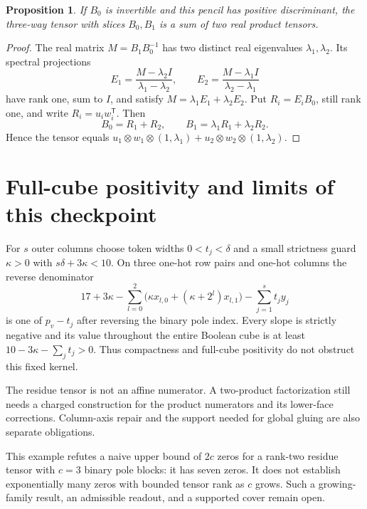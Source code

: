 \documentclass[11pt]{article}
\newtheorem{proposition}{Proposition}
\begin{document}
\begin{proposition}
If $B_0$ is invertible and this pencil has positive discriminant, the
three-way tensor with slices $B_0,B_1$ is a sum of two real product tensors.
\end{proposition}
\begin{proof}
The real matrix $M=B_1B_0^{-1}$ has two distinct real eigenvalues
$\lambda_1,\lambda_2$. Its spectral projections
\[
 E_1=\frac{M-\lambda_2I}{\lambda_1-\lambda_2},\qquad
 E_2=\frac{M-\lambda_1I}{\lambda_2-\lambda_1}
\]
have rank one, sum to $I$, and satisfy
$M=\lambda_1E_1+\lambda_2E_2$. Put $R_i=E_iB_0$, still rank one,
and write $R_i=u_iw_i^{\mathsf T}$. Then
\[
 B_0=R_1+R_2,\qquad B_1=\lambda_1R_1+\lambda_2R_2.
\]
Hence the tensor equals
$u_1\otimes w_1\otimes(1,\lambda_1)+
 u_2\otimes w_2\otimes(1,\lambda_2)$.
\end{proof}

\section{Full-cube positivity and limits of this checkpoint}
For $s$ outer columns choose token widths $0<t_j<\delta$ and a small
strictness guard $\kappa>0$ with $s\delta+3\kappa<10$. On three one-hot
row pairs and one-hot columns the reverse denominator
\[
 17+3\kappa-
 \sum_{l=0}^2\bigl(\kappa x_{l,0}+(\kappa+2^l)x_{l,1}\bigr)
 -\sum_{j=1}^s t_jy_j
\]
is one of $p_v-t_j$ after reversing the binary pole index. Every slope
is strictly negative and its value throughout the entire Boolean cube
is at least $10-3\kappa-\sum_jt_j>0$. Thus compactness and full-cube
positivity do not obstruct this fixed kernel.

The residue tensor is not an affine numerator. A two-product
factorization still needs a charged construction for the product
numerators and its lower-face corrections. Column-axis repair and the
support needed for global gluing are also separate obligations.

This example refutes a naive upper bound of $2c$ zeros for a rank-two
residue tensor with $c=3$ binary pole blocks: it has seven zeros. It does
not establish exponentially many zeros with bounded tensor rank as
$c$ grows. Such a growing-family result, an admissible readout, and a
supported cover remain open.
\end{document}
